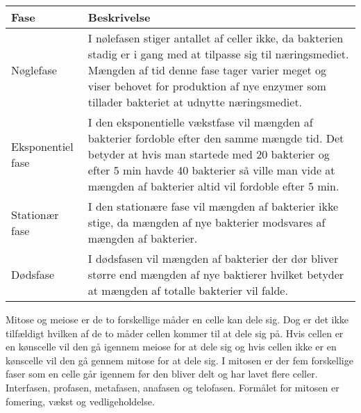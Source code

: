 \newpage
\begin{longtable}{| m{3cm} | m{14cm} |}
    \hline
    Fase & Beskrivelse \\ \hline
    
    Nøglefase & I nølefasen stiger antallet af celler ikke, da bakterien stadig er i gang med at tilpasse sig til næringsmediet. Mængden af tid denne fase tager varier meget og viser behovet for produktion af nye enzymer som tillader bakteriet at udnytte næringsmediet. \\ \hline

    Eksponentiel fase &  I den eksponentielle vækstfase vil mængden af bakterier fordoble efter den samme mængde tid. Det betyder at hvis man startede med 20 bakterier og efter 5 min havde 40 bakterier så ville man vide at mængden af bakterier altid vil fordoble efter 5 min. \\ \hline

    Stationær fase &  I den stationære fase vil mængden af bakterier ikke stige, da mængden af nye bakterier modsvares af mængden af bakterier. \\  \hline 

    Dødsfase & I dødsfasen vil mængden af bakterier der dør bliver større end mængden af nye baktierer hvilket betyder at mængden af totalle bakterier vil falde. \\ \hline
\end{longtable}
Mitose og meiose er de to forskellige måder en celle kan dele sig. Dog er det ikke tilfældigt hvilken af de to måder cellen kommer til at dele sig på. Hvis cellen er en kønscelle vil den gå igennem meiose for at dele sig og hvis cellen ikke er en kønscelle vil den gå gennem mitose for at dele sig.
I mitosen er der fem forskellige faser som en celle går igennem før den bliver delt og har lavet flere celler. Interfasen, profasen, metafasen, anafasen og telofasen. Formålet for mitosen er fomering, vækst og vedligeholdelse.

